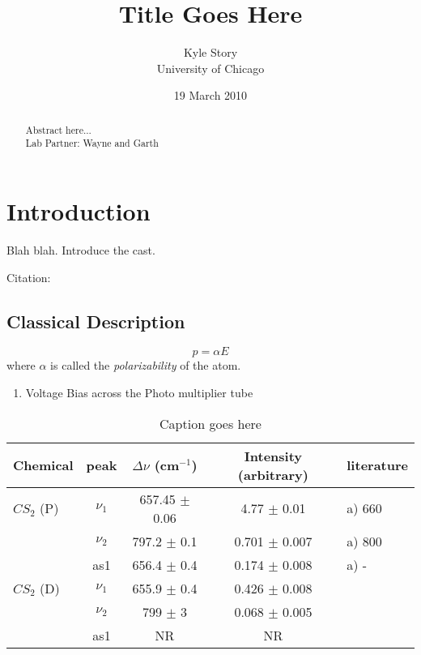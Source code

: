 \documentclass[12pt]{article}
\title{Title Goes Here}
\author{Kyle Story\\University of Chicago}
\date{19 March 2010}
\begin{document}
\maketitle

\begin{abstract}
  Abstract here...
  \\ Lab Partner: Wayne and Garth
\end{abstract}

\tableofcontents
\listoffigures
\newpage

\section{Introduction}
Blah blah.  Introduce the cast.

Citation: \cite{Ferraro}

\subsection{Classical Description}

\begin{equation}
  p = \alpha E
\label{eqn:dipole_moment}
\end{equation}
where $\alpha$ is called the \textit{polarizability} of the atom.

\begin{enumerate}
  \item Voltage Bias across the Photo multiplier tube
\end{enumerate}

\begin{table}
  \caption{Caption goes here}
  \begin{center}
    \begin{tabular}{|| l | c | c | c | l ||}
      \hline
      Chemical & peak &  $\Delta \nu$ (cm$^{-1}$) & Intensity (arbitrary) & literature\\
      \hline\hline
      $CS_2$ (P)    & $\nu_1$  & 657.45 $\pm$ 0.06 & 4.77  $\pm$ 0.01  & a) 660 \\
                    & $\nu_2$  & 797.2  $\pm$ 0.1  & 0.701 $\pm$ 0.007 & a) 800 \\
                    & as1  & 656.4  $\pm$ 0.4  & 0.174 $\pm$ 0.008 & a) -  \\
      \hline
      $CS_2$ (D)    & $\nu_1$  & 655.9  $\pm$ 0.4  & 0.426 $\pm$ 0.008 & \\
                    & $\nu_2$  & 799    $\pm$ 3    & 0.068 $\pm$ 0.005 & \\
                    & as1  & NR & NR & \\
      \hline
    \end{tabular}
  \end{center}
  \label{tab:data1}
\end{table}
\end{document}
